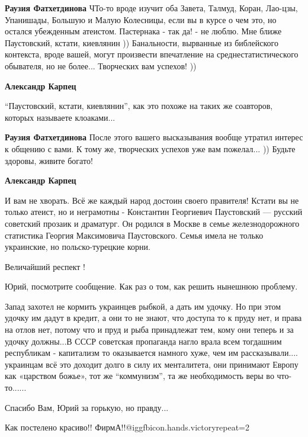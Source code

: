 \begin{itemize}
\begin{itemize}
\textbf{Раузия Фатхетдинова} ЧТо-то вроде изучит оба Завета, Талмуд, Коран, Лао-цзы, Упанишады, Большую и Малую Колесницы, если вы в курсе о чем это, но остался убежденным атеистом. Пастернака - так да! - не люблю. Мне ближе Паустовский, кстати, киевлянин ))
Банальности, вырванные из библейского контекста, вроде вашей, могут произвести впечатление на среднестатистического обывателя, но не более...
Творческих вам успехов! ))

\textbf{Александр Карпец} 

\enquote{Паустовский, кстати, киевлянин}, как это похоже на таких же соавторов,
которых называете клоаками...

\textbf{Раузия Фатхетдинова} После этого вашего высказывания вообще утратил интерес к общению с вами.
К тому же, творческих успехов уже вам пожелал... ))
Будьте здоровы, живите богато!

\textbf{Александр Карпец} 

И вам не хворать. Всё же каждый народ достоин своего правителя! Кстати вы не
только атеист, но и неграмотны - Константин Георгиевич Паустовский — русский
советский прозаик и драматург. Он родился в Москве в семье железнодорожного
статистика Георгия Максимовича Паустовского. Семья имела не только украинские,
но польско-турецкие корни.

\end{itemize} %

Величайший респект !

Юрий, посмотрите сообщение. Как раз о том, как решить нынешнюю проблему.


Запад захотел не кормить украинцев рыбкой, а дать им удочку. Но при этом удочку
им дадут в кредит, а они то не знают, что доступа то к пруду нет, и права на
отлов нет, потому что и пруд и рыба принадлежат тем, кому они теперь и за
удочку должны...В СССР советская пропаганда нагло врала всем тогдашним
республикам - капитализм то оказывается намного хуже, чем им
рассказывали.... украинцам всё это доходит долго в силу их менталитета, они
принимают Европу как «царством божье», тот же \enquote{коммунизм}, та же необходимость
веры во что-то......


Спасибо Вам, Юрий за горькую, но правду...

Как постелено красиво!! ФирмА!!@igg{fbicon.hands.victory}{repeat=2}


\end{itemize}
